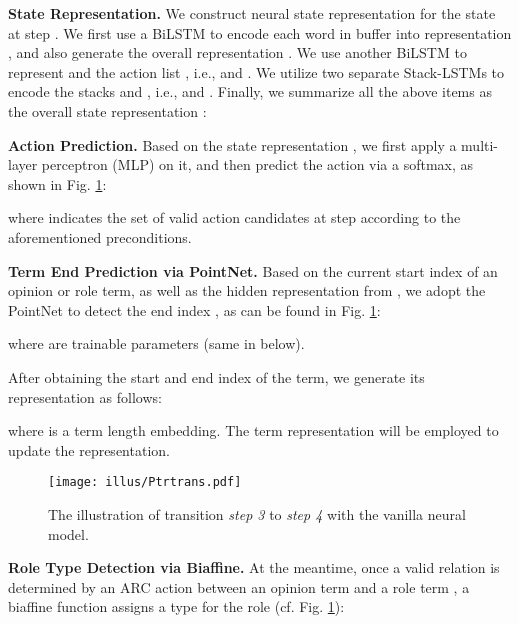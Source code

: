 \documentclass[letterpaper]{article} \usepackage{aaai22}  \usepackage{times}  \usepackage{helvet}  \usepackage{courier}  \usepackage[hyphens]{url}  \usepackage{graphicx} \urlstyle{rm} \def\UrlFont{\rm}  \usepackage{natbib}  \usepackage{caption} \DeclareCaptionStyle{ruled}{labelfont=normalfont,labelsep=colon,strut=off} \frenchspacing  \setlength{\pdfpagewidth}{8.5in}  \setlength{\pdfpageheight}{11in}  \usepackage{algorithm}
\begin{document}
\noindent\textbf{State Representation.}
We construct neural state representation  for the state  at step .
We first use a BiLSTM to encode each word in buffer  into representation , and also generate the overall  representation .
We use another BiLSTM to represent  and the action list , i.e.,  and  .
We utilize two separate Stack-LSTMs to encode the stacks  and , i.e.,  and .
Finally, we summarize all the above items as the overall state representation :












\noindent\textbf{Action Prediction.}
Based on the state representation , we first apply a multi-layer perceptron (MLP) on it, and then predict the action  via a softmax, as shown in Fig. \ref{TPtr1}:

where  indicates the set of valid action candidates at step  according to the aforementioned preconditions.














\noindent\textbf{Term End Prediction via PointNet.}
Based on the current start index  of an opinion or role term, as well as the hidden representation  from , 
we adopt the PointNet to detect the end index , as can be found in Fig. \ref{TPtr1}:

where  are trainable parameters (same in below).


After obtaining the start and end index of the term, we generate its representation  as follows:

where  is a term length embedding.
The term representation will be employed to update the  representation.



\begin{figure}[!t]
\centering
\texttt{[image: illus/Ptrtrans.pdf]}
\caption{
The illustration of transition \emph{step 3} to \emph{step 4} with the vanilla neural model.
}
\label{TPtr1}
\end{figure}







\noindent\textbf{Role Type Detection via Biaffine.}
At the meantime, once a valid relation is determined by an ARC action between an opinion term  and a role term , a biaffine function \cite{BiaffineDozatM17} assigns a type  for the role (cf. Fig. \ref{TPtr1}):
\setlength\abovedisplayskip{2pt}
\setlength\belowdisplayskip{2pt}
\end{document}
